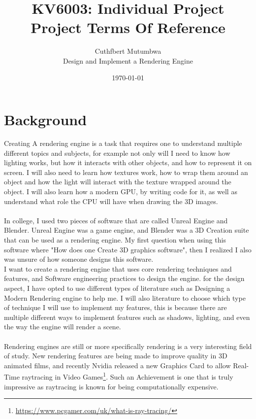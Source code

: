 
\title{KV6003: Individual Project\\ Project Terms Of Reference}
\author{Cuthfbert Mutumbwa\\ Design and Implement a Rendering Engine}
\date{\today}

\maketitle

\section{Background}
Creating A rendering engine is a task that requires one to understand multiple different topics and subjects, for example not only will I need to know how lighting works, but how it interacts with other objects, and how to represent it on screen. I will also need to learn how textures work, how to wrap them around an object and how the light will interact with the texture wrapped around the object.
I will also learn how a modern GPU, by writing code for it, as well as understand what role the CPU will have when drawing the 3D images.
\\\\
In college, I used two pieces of software that are called Unreal Engine and Blender. Unreal Engine was a game engine, and Blender was a 3D Creation suite that can be used as a rendering engine.
My first question when using this software where "How does one Create 3D graphics software", then I realized I also was unsure of how someone designs this software.
\\
I want to create a rendering engine that uses core rendering techniques and features, and Software engineering practices to design the engine. for the design aspect, I have opted to use different types of literature such as Designing a Modern Rendering engine \citep{designengine} to help me.  I will also literature to choose which type of technique I will use to implement my features, this is because there are multiple different ways to implement features such as shadows, lighting, and even the way the engine will render a scene.
\\\\
Rendering engines are still or more specifically rendering is a very interesting field of study. New rendering features are being made to improve quality in 3D animated films, and recently Nvidia released a new Graphics Card to allow Real-Time raytracing in Video Games\footnote{\url{https://www.pcgamer.com/uk/what-is-ray-tracing/}}. Such an Achievement is one that is truly impressive as raytracing is known for being computationally expensive. 
